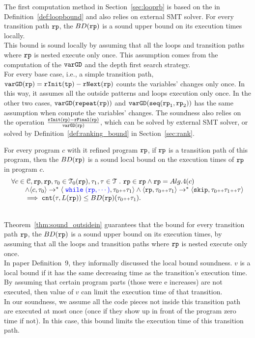 The first computation method in Section~\ref{sec:looprb} is based on the in Definition~\ref{def:loopbound} and also relies on external SMT solver.
For every transition path $\mathtt{rp}$, the $BD(\mathtt{rp})$
is a sound upper bound on its execution times locally.
\\
This bound is sound locally by assuming
that all the loops and transition paths where $\mathtt{rp}$ is nested execute only once.
This assumption comes from the computation of the $\mathtt{varGD}$ and the depth first search strategy.
\\
For every base case, i.e., a simple transition path, 
$\mathtt{varGD}(\mathtt{rp}) =  \mathtt{rInit}(\mathtt{tp}) - \mathtt{rNext}(\mathtt{rp})$
counts the variables' changes only once. In this way, it assumes all the outside patterns and loops execution only once.
In the other two cases,  $\mathtt{varGD}(\mathtt{repeat}(\mathtt{rp}))$ and $\mathtt{varGD}(\mathtt{seq}(\mathtt{rp}_1, \mathtt{rp}_2))$
has the same assumption when compute the variables' changes.
The soundness also relies on the operation $\frac{\mathtt{rInit}(\mathtt{rp}) - \mathtt{rFinal}(\mathtt{rp})}{\mathtt{varGD}(\mathtt{rp})}$,
which can be solved by external SMT solver,
or solved by Definition~\ref{def:ranking_bound} in Section~\ref{sec:rank}.
%
\begin{thm}
\label{thm:sound_outsidein}
For every program $c$ with it refined program $\mathtt{rp}$,
if $\mathtt{rp}$ is a transition path of this program, then the $BD(\mathtt{rp})$
is a sound local bound on the execution times of $\mathtt{rp}$ in program $c$.
\[
    \begin{array}{l}
    \forall c \in \cdom, \rprog, \rprog, \trace_0 \in \tdom_0(\rprog), \trace_1, \trace \in \tdom \st 
    \rprog \in \rprog \land
    \rprog = Alg.4(c)
    \\ \qquad
    \land
    \config{c, \trace_0} \to^* \config{\highlight{\ewhile (\rprog, \cdots)}, \trace_0 \tracecat \trace_1} 
    \land 
    \config{\rprog, \trace_0 \tracecat \trace_1} \to^* \config{{\eskip, \trace_0 \tracecat \trace_1 \tracecat \trace}}
    \\ \qquad
    \implies {\vcounter(\trace, L(\rprog))} \leq BD(\rprog)(\trace_0 \tracecat \trace_1).
    \end{array}
\]
\end{thm}
\\
Theorem~\ref{thm:sound_outsidein} guarantees that
the bound for every transition path $\mathtt{rp}$, the $BD(\mathtt{rp})$
is a sound upper bound on its execution times, by assuming
that all the loops and transition paths where $\mathtt{rp}$ is nested execute only once.
\\
In paper \cite{sinn2017complexity} Definition~9, they informally discussed the local bound soundness.
$v$ is a local bound if it has the same decreasing time as the transition's execution time.
By assuming that certain program parts (those were e increases) are not executed,
then value of $v$ can limit the execution time of that transition.
\\
In our soundness, we assume all the code pieces not inside this transition path are executed at most once (once if they show up in front of the program
zero time if not).
In this case, this bound limits the execution time of this transition path.

